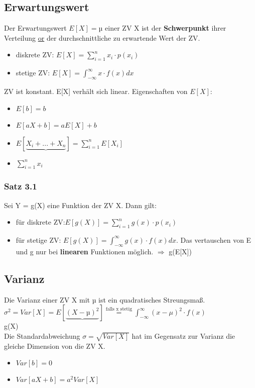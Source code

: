 \subsection{Erwartungswert}
Der Erwartungswert $E[X] = µ$ einer ZV X ist der \textbf{Schwerpunkt} ihrer Verteilung \underline{or} der durchschnittliche zu erwartende Wert der ZV.
\begin{itemize}
  \item diskrete ZV: $E[X] = \sum_{i=1}^{n} x_{i} \cdot p(x_{i})$
  \item stetige ZV: $E[X] = \int_{-\infty}^{\infty} x \cdot f(x) dx$
\end{itemize}
ZV ist konstant. E[X] verhält sich linear. Eigenschaften von $E[X]$:
\begin{itemize}
  \item $E[b] = b$
  \item $E[aX + b] = aE[X] + b$
  \item $E[\underbrace{X_{i} + ... + X_{n}}] = \sum_{i=1}^{n} E[X_{i}]$
  \item $\sum_{i=1}^{n} x_{i}$
\end{itemize}
\subsubsection{Satz 3.1}
Sei Y = g(X) eine Funktion der ZV X. Dann gilt:
\begin{itemize}
  \item für diskrete ZV:$E[g(X)] = \sum_{i=1}^{n} g(x) \cdot p(x_ {i})$
  \item für stetige ZV: $E[g(X)] = \int_{- \infty}^{\infty} g(x) \cdot f(x) dx$. Das vertauschen von E und g nur bei \textbf{linearen} Funktionen möglich. $\Rightarrow$ g(E[X])
\end{itemize}
\subsection{Varianz}
Die Varianz einer ZV X mit µ ist ein quadratisches Streungsmaß. $\sigma^2 = Var[X] = E[\underbrace{(X - µ)^2}] \stackrel{\text{falls x stetig}}{=} \int_{-\infty}^{\infty} (x-\mu)^2 \cdot f(x)$\\
g(X)\\
Die Standardabweichung $\sigma = \sqrt{Var[X]}$ hat im Gegensatz zur Varianz die gleiche Dimension von die ZV X.
\begin{itemize}
  \item $Var[b] = 0$
  \item $Var[aX + b] = a^2 Var[X]$
\end{itemize}
